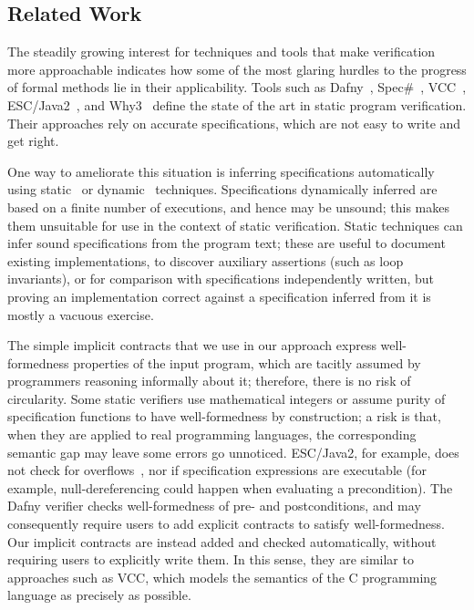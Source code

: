 \subsection{Related Work}\label{related-work}

The steadily growing interest for techniques and tools that make verification more approachable indicates how some of the most glaring hurdles to the progress of formal methods lie in their applicability.
Tools such as Dafny~\cite{LEINO10}, Spec\#~\cite{BARNETT05}, VCC~\cite{COHEN09}, ESC/Java2~\cite{COK05,JAMES10}, and Why3~\cite{BOBOT11} define the state of the art in static program verification.
Their approaches rely on accurate specifications, which are not easy to write and get right.

One way to ameliorate this situation is inferring specifications automatically using static~\cite{CHANG05,KOVACS09,FURIA10} or dynamic~\cite{ERNST01,WEI11,WASYLKOVSKI11} techniques.
Specifications dynamically inferred are based on a finite number of executions, and hence may be unsound; this makes them unsuitable for use in the context of static verification.
Static techniques can infer sound specifications from the program text; these are useful to document existing implementations, to discover auxiliary assertions (such as loop invariants), or for comparison with specifications independently written, but proving an implementation correct against a specification inferred from it is mostly a vacuous exercise.

The simple implicit contracts that we use in our approach express well-formedness properties of the input program, which are tacitly assumed by programmers reasoning informally about it; therefore, there is no risk of circularity.
Some static verifiers use mathematical integers or assume purity of specification functions to have well-formedness by construction; a risk is that, when they are applied to real programming languages, the corresponding semantic gap may leave some errors go unnoticed.
ESC/Java2, for example, does not check for overflows~\cite{KINIRY06}, nor if specification expressions are executable (for example, null-dereferencing could happen when evaluating a precondition).
The Dafny verifier checks well-formedness of pre- and postconditions, and may consequently require users to add explicit contracts to satisfy well-formedness. Our implicit contracts are instead added and checked automatically, without requiring users to explicitly write them.
In this sense, they are similar to approaches such as VCC, which models the semantics of the C programming language as precisely as possible.

